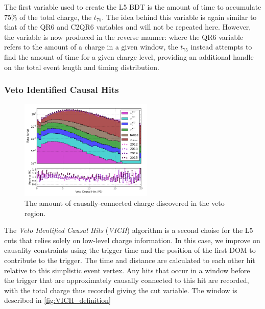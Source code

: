 The first variable used to create the L5 BDT is the amount of time to accumulate 75\% of the total charge, the \emph{$t_{75}$}. 
The idea behind this variable is again similar to that of the QR6 and C2QR6 variables and will not be repeated here.
However, the variable is now produced in the reverse manner: where the QR6 variable refers to the amount of a charge in a given window, the $t_{75}$ instead attempts to find the amount of time for a given charge level, providing an additional handle on the total event length and timing distribution.


\subsubsection{Veto Identified Causal Hits}
\begin{figure}[h]
	\centering
		\includegraphics[width=2.5in]{Veto_Causal_Hits_(PE)_log.png}
		\caption[Veto Identified Causal Hits]{The amount of causally-connected charge discovered in the veto region.}
	\label{fig:vich}
\end{figure}

The \emph{Veto Identified Causal Hits} (\emph{VICH}) algorithm is a second choise for the L5 cuts that relies solely on low-level charge information.
In this case, we improve on causality constraints using the trigger time and the position of the first DOM to contribute to the trigger.
The time and distance are calculated to each other hit relative to this simplistic event vertex.
Any hits that occur in a window before the trigger that are approximately causally connected to this hit are recorded, with the total charge thus recorded giving the cut variable.
The window is described in \ref{fig:VICH_definition}


